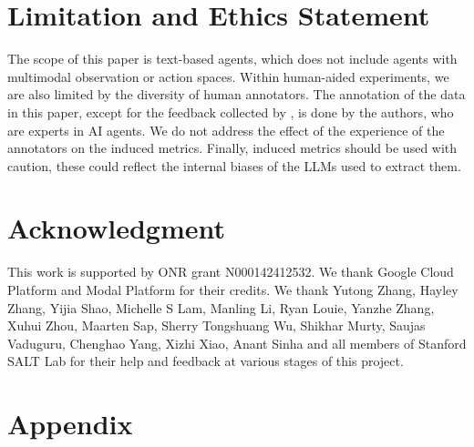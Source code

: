 \documentclass{article} %
\begin{document}
\section*{Limitation and Ethics Statement}
The scope of this paper is text-based agents, which does not include agents with multimodal observation or action spaces. Within human-aided experiments, we are also limited by the diversity of human annotators. The annotation of the data in this paper, except for the feedback collected by \citet{shao2024collaborative}, is done by the authors, who are experts in AI agents. We do not address the effect of the experience of the annotators on the induced metrics. Finally, induced metrics should be used with caution, these could reflect the internal biases of the LLMs used to extract them. 

\section*{Acknowledgment}
This work is supported by ONR grant N000142412532. We thank Google Cloud Platform and Modal Platform for their credits.
We thank Yutong Zhang, Hayley Zhang, Yijia Shao, Michelle S Lam, Manling Li, Ryan Louie, Yanzhe Zhang, Xuhui Zhou, Maarten Sap, Sherry Tongshuang Wu, Shikhar Murty, Saujas Vaduguru, Chenghao Yang, Xizhi Xiao, Anant Sinha and all members of Stanford SALT Lab for their help and feedback at various stages of this project. 





\newpage
\appendix
\section*{Appendix}

\end{document}
